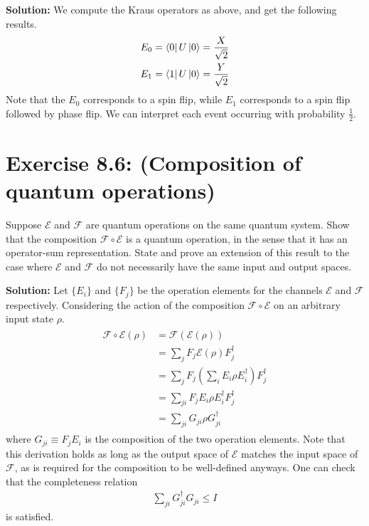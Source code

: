 \documentclass{book}
\newcommand{\mc}[1]{\mathcal{#1}}
\begin{document}
    \textbf{Solution:} We compute the Kraus operators as above, and get the following results.
    \begin{align}
        E_0 = \bra{0}U\ket{0} = \frac{X}{\sqrt{2}} \\
        E_1 = \bra{1}U\ket{0} = \frac{Y}{\sqrt{2}}
    \end{align}
    Note that the $E_0$ corresponds to a spin flip, while $E_1$ corresponds to a spin flip followed by phase flip. We can interpret each event occurring with probability $\frac{1}{2}$.
    
\section*{Exercise 8.6: (Composition of quantum operations)}
    Suppose $\mc{E}$ and $\mc{F}$ are quantum operations on the same quantum system. Show that the composition $\mc{F}\circ \mc{E}$ is a quantum operation, in the sense that it has an operator-sum representation. State and prove an extension of this result to the case where $\mc{E}$ and $\mc{F}$ do not necessarily have the same input and output spaces. 
    
    \textbf{Solution:} Let $\{E_i\}$ and $\{F_j\}$ be the operation elements for the channels $\mc{E}$ and $\mc{F}$ respectively. Considering the action of the composition $\mc{F} \circ \mc{E}$ on an arbitrary input state $\rho$.
    \begin{align}
    \begin{aligned}
        \mc{F}\circ\mc{E} (\rho) &= \mc{F}(\mc{E}(\rho)) \\
        &= \sum_j F_j \mc{E}(\rho) F_j^\dagger \\
        &= \sum_j F_j \left(\sum_i E_i \rho E_i^\dagger \right) F_j^\dagger \\
        &= \sum_{ji} F_j E_i \rho E_i^\dagger F_j^\dagger \\
        &= \sum_{ji} G_{ji} \rho G_{ji}^\dagger 
    \end{aligned}
    \end{align}
    where $G_{ji} \equiv F_j E_i$ is the composition of the two operation elements. Note that this derivation holds as long as the output space of $\mc{E}$ matches the input space of $\mc{F}$, as is required for the composition to be well-defined anyways. One can check that the completeness relation
    \begin{align}
        \sum_{ji}G_{ji}^\dagger G_{ji} \leq I 
    \end{align}
    is satisfied.
\end{document}
